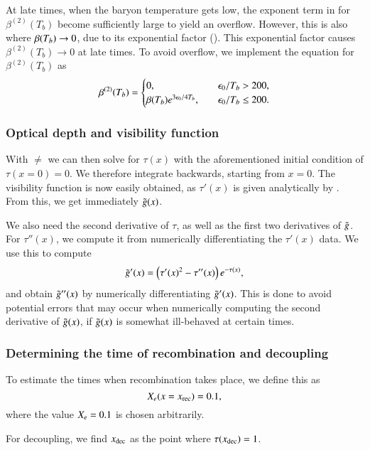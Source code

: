 At late times, when the baryon temperature gets low, the exponent term in  for $\beta^{(2)}(T_b)$ become sufficiently large to yield an overflow. However, this is also where $\beta(T_b)\to0$, due to its exponential factor (). This exponential factor causes $\beta^{(2)}(T_b)\to0$ at late times. To avoid overflow, we implement the equation for $\beta^{(2)}(T_b)$ as 
\begin{equation}
    \beta^{(2)}(T_b) = \begin{cases}
        0,\quad &\epsilon_0/T_b > 200, \\
        \beta(T_b) e^{3\epsilon_0/4T_b},\quad &\epsilon_0/T_b \leq 200.
    \end{cases}
\end{equation} 
 

\subsubsection{Optical depth and visibility function} \label{sssec:M2:implementations:optical_depth}
With $\ne$ we can then solve  for $\tau(x)$ with the aforementioned initial condition of $\tau(x=0)=0$. We therefore integrate backwards, starting from $x=0$. The visibility function is now easily obtained, as $\tau'(x)$ is given analytically by . From this, we get immediately $\tilde{g}(x)$. 

We also need the second derivative of $\tau$, as well as the first two derivatives of $\tilde{g}$. For $\tau''(x)$, we compute it from numerically differentiating the $\tau'(x)$ data. We use this to compute 
\begin{equation} \label{eq:M2:implementations:dg_dx}
    \tilde{g}'(x) = \left( \tau'(x)^2 - \tau''(x) \right) e^{-\tau(x)}, 
\end{equation}
and obtain $\tilde{g}''(x)$ by numerically differentiating $\tilde{g}'(x)$. This is done to avoid potential errors that may occur when numerically computing the second derivative of $\tilde{g}(x)$, if $\tilde{g}(x)$ is somewhat ill-behaved at certain times. 

\subsubsection{Determining the time of recombination and decoupling} \label{sssec:M2:implementations:determining_the_time_of_recombination_and_decoupling}
To estimate the times when recombination takes place, we define this as 
\begin{equation}
    X_e(x=x_\mathrm{rec}) = 0.1,  
\end{equation}
where the value $X_e=0.1$ is chosen arbitrarily. 

For decoupling, we find $x_\mathrm{dec}$ as the point where $\tau(x_\mathrm{dec})=1$.  